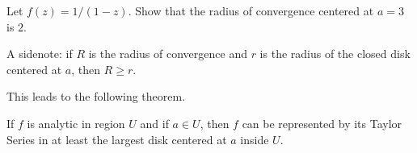 \documentclass[notes]{subfile}
\begin{document}
\begin{exercise}
    Let $f(z) = 1/(1-z)$.  Show that the radius 
    of convergence centered at $a=3$ is $2$.
\end{exercise}

A sidenote: if $R$ is the 
radius of convergence and
$r$ is the radius of the closed
disk centered at $a$, then
$R \ge r$.

\noindent
This leads to the following theorem.

\begin{theorem}
    If $f$ is analytic in region $U$ and if $a \in U$, 
    then $f$ can be represented by its Taylor Series
    in at least the largest disk centered at $a$ inside $U$.
\end{theorem}
\end{document}
